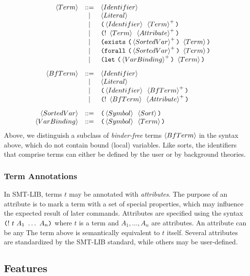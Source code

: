 \documentclass[english,a4paper,10pt]{article}
\begin{document}
\begin{alignat*}{1}
 & \begin{array}{rcl}
\left\langle Term\right\rangle & ::= & \left\langle Identifier\right\rangle\\
 & | & \left\langle Literal\right\rangle\\
 & | & \texttt{(}\left\langle Identifier\right\rangle\mbox{ }\left\langle Term\right\rangle^{+}\texttt{)}\\
 & | & \texttt{(}!\mbox{ }\left\langle Term\right\rangle\mbox{ }\left\langle Attribute\right\rangle^{+}\texttt{)}\\
 & | & \texttt{(}\texttt{exists}\mbox{ }\texttt{(}\left\langle SortedVar \right\rangle^{+}\texttt{)}\mbox{ }\left\langle Term\right\rangle\texttt{)}\\
 & | & \texttt{(}\texttt{forall}\mbox{ }\texttt{(}\left\langle SortedVar \right\rangle^{+}\texttt{)}\mbox{ }\left\langle Term\right\rangle\texttt{)}\\
 & | & \texttt{(}\texttt{let}\mbox{ }\texttt{(}\left\langle VarBinding \right\rangle^{+}\texttt{)}\mbox{ }\left\langle Term\right\rangle\texttt{)}\\[2ex]
 \left\langle BfTerm\right\rangle & ::= & \left\langle Identifier\right\rangle\\
 & | & \left\langle Literal\right\rangle\\
 & | & \texttt{(}\left\langle Identifier\right\rangle\mbox{ }\left\langle BfTerm\right\rangle^{+}\texttt{)}\\
 & | & \texttt{(}!\mbox{ }\left\langle BfTerm\right\rangle\mbox{ }\left\langle Attribute\right\rangle^{+}\texttt{)}\\[2ex]
 \left\langle SortedVar \right\rangle & ::= & \texttt{(}\left\langle Symbol\right\rangle\mbox{ }\left\langle Sort\right\rangle\texttt{)}\\
 \left\langle VarBinding \right\rangle & ::= & \texttt{(}\left\langle Symbol\right\rangle\mbox{ }\left\langle Term\right\rangle\texttt{)}\\
\end{array}
\end{alignat*}
Above,
we distinguish a subclass of \emph{binder-free} terms $\left\langle BfTerm\right\rangle$ in the syntax above,
which do not contain bound (local) variables.
Like sorts, the identifiers that comprise terms
can either be defined by the user or by background theories.

\subsubsection{Term Annotations}
\label{ssec:term-annotations}
In SMT-LIB,
terms $t$ may be annotated with \emph{attributes}.
The purpose of an attribute is to mark a term with a set of special properties, 
which may influence the expected result of later commands.
Attributes are specified using the
syntax $\texttt{(}!\mbox{ }t\mbox{ }A_1\mbox{ }\ldots\mbox{ }A_n\texttt{)}$
where $t$ is a term and $A_1, \ldots, A_n$ are attributes.
An attribute can be any
The term above is semantically equivalent to $t$ itself.
Several attributes are standardized by the SMT-LIB standard, while
others may be user-defined.

\subsection{Features}
\label{ssec:syntax-features}
\end{document}

